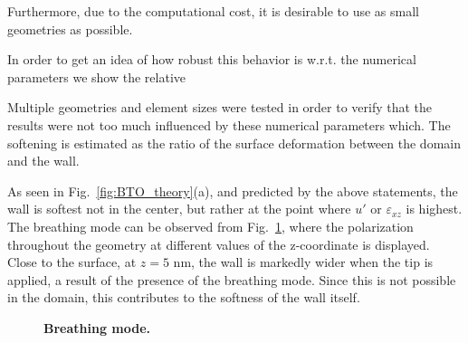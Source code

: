 Furthermore, due to the computational cost, it is desirable to use as small geometries as possible.

In order to get an idea of how robust this behavior is w.r.t. the numerical parameters we show the relative 

Multiple geometries and element sizes were tested in order to verify that the results were not too much influenced by these numerical parameters which. 
The softening is estimated as the ratio of the surface deformation between the domain and the wall.

As seen in Fig.~\ref{fig:BTO_theory}(a), and predicted by the above statements, the wall is softest not in the center, but rather at the point where $u'$ or $\varepsilon_{xz}$ is highest.
The breathing mode can be observed from Fig.~\ref{fig:BTO_breathing}, where the polarization throughout the geometry at different values of the z-coordinate is displayed.
Close to the surface, at $z=5$ nm, the wall is markedly wider when the tip is applied, a result of the presence of the breathing mode.
Since this is not possible in the domain, this contributes to the softness of the wall itself.
\begin{figure}
	\caption{{\bf Breathing mode.} \label{fig:BTO_breathing}}
\end{figure}

\printbibliography
